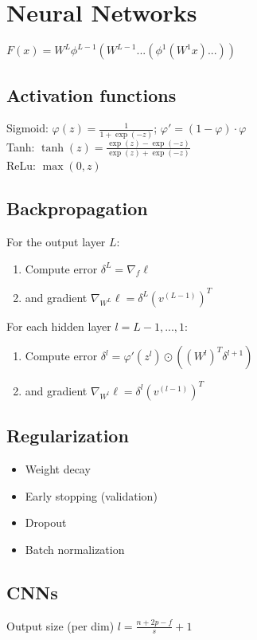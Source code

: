 \section*{Neural Networks}
$F(x)=W^{L}\phi^{L-1}(W^{L-1}...(\phi^{1}(W^{1}x)...))$

\subsection*{Activation functions}
Sigmoid: $\varphi(z) = \frac{1}{1+\exp(-z)}$;  $\varphi' = (1 - \varphi)\cdot\varphi$\\
Tanh: $\tanh(z) = \frac{\exp(z)-\exp(-z)}{\exp(z)+\exp(-z)}$\\
ReLu:  $\max(0,z)$

\subsection*{Backpropagation}
For the output layer $L$:
\begin{enumerate}[noitemsep,leftmargin=6mm,topsep=0pt,parsep=0pt,partopsep=0pt]
\item Compute error $\delta^{L} = \nabla_f\ell$
\item and gradient $\nabla_{W^L}\ell=\delta^L(v^{(L-1)})^T$
\end{enumerate}
For each hidden layer $l=L-1,...,1$:
\begin{enumerate}[noitemsep,leftmargin=6mm,topsep=0pt,parsep=0pt,partopsep=0pt]
\item  Compute error $\delta^{l} =\varphi'(z^l)\odot ((W^l)^T\delta^{l+1})$
\item and gradient $\nabla_{W^l}\ell=\delta^l(v^{(l-1)})^T$
\end{enumerate}

\subsection*{Regularization}
\begin{itemize}[noitemsep,leftmargin=6mm,topsep=2pt,parsep=2pt,partopsep=2pt]
    \item Weight decay
    \item Early stopping (validation)
    \item Dropout
    \item Batch normalization
\end{itemize}

\subsection*{CNNs}
Output size (per dim) $l=\frac{n+2p-f}{s}+1$
\\